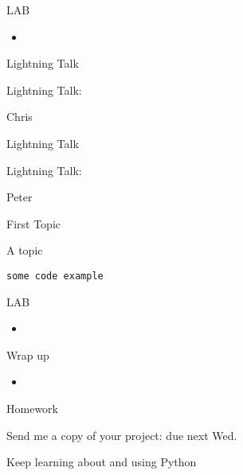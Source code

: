 \documentclass{beamer}
\begin{document}
\begin{frame}{LAB}

\begin{itemize}
  \item
\end{itemize}

\end{frame}

\begin{frame}{Lightning Talk}

{\centering

\vfill
{\LARGE Lightning Talk:  }

\vfill
{\Huge Chris}

\vfill
}
\end{frame}

\begin{frame}{Lightning Talk}

{\centering

\vfill
{\LARGE Lightning Talk:  }

\vfill
{\Huge Peter}

\vfill
}
\end{frame}


\begin{frame}[fragile]{First Topic}

 {\Large A topic}

\begin{verbatim}
some code example
\end{verbatim}

\end{frame} 

\begin{frame}{LAB}

\begin{itemize}
  \item
\end{itemize}

\end{frame}

\begin{frame}{Wrap up}

\begin{itemize}
  \item
\end{itemize}

\end{frame}



\begin{frame}{Homework}

\vfill
{\Large Send me a copy of your project: due next Wed.}

\vfill
{\Large Keep learning about and using Python}
\vfill

\end{frame}
\end{document}
